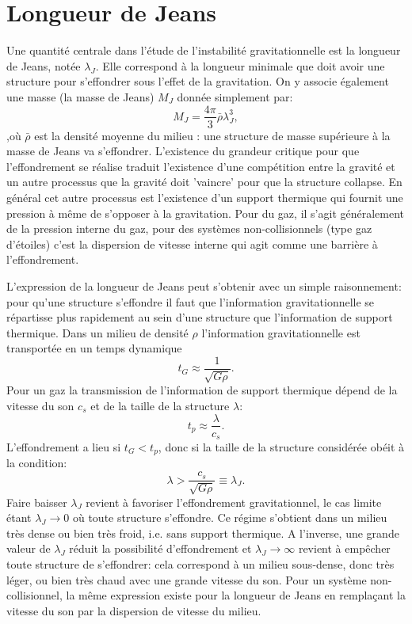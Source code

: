 \section{Longueur de Jeans}
Une quantité centrale dans l'étude de l'instabilité gravitationnelle est la longueur de Jeans, notée $\lambda_J$. Elle correspond à la longueur minimale  que doit avoir une structure pour s'effondrer sous l'effet de la gravitation. On y associe également une masse (la masse de Jeans) $M_J$ donnée simplement par:
\begin{equation}
M_J=\frac{4\pi}{3}\bar\rho\lambda_J^3,
\end{equation}
,où $\bar \rho$ est la densité moyenne du milieu : une structure de masse supérieure à la masse de Jeans va s'effondrer. L'existence du grandeur critique pour que l'effondrement se réalise traduit l'existence d'une compétition entre la gravité et un autre processus que la gravité doit 'vaincre' pour que la structure collapse. En général cet autre processus est l'existence d'un support thermique qui fournit une pression à même de s'opposer à la gravitation. Pour du gaz, il s'agit généralement de la pression interne du gaz, pour des systèmes non-collisionnels (type gaz d'étoiles) c'est la dispersion de vitesse interne qui agit comme une barrière à l'effondrement.

L'expression de la longueur de Jeans peut s'obtenir avec un simple raisonnement: pour qu'une structure s'effondre il faut que l'information gravitationnelle se répartisse plus rapidement au sein d'une structure que l'information de support thermique. Dans un milieu de densité $\rho$ l'information gravitationnelle est transportée en un temps dynamique
\begin{equation}
t_G\approx \frac{1}{\sqrt{G\rho}}.
\end{equation}
Pour un gaz la transmission de l'information de support thermique dépend de la vitesse du son $c_s$ et de la taille de la structure $\lambda$:
\begin{equation}
t_p\approx\frac{\lambda}{c_s}.
\end{equation}
L'effondrement a lieu si $t_G<t_p$, donc si la taille de la structure considérée obéit à la condition:
\begin{equation}
\lambda >\frac{c_s}{\sqrt{G\rho}}\equiv \lambda_J.
\end{equation}
Faire baisser $\lambda_J$ revient à favoriser l'effondrement gravitationnel, le cas limite étant $\lambda_J \rightarrow 0$ où toute structure s'effondre. Ce régime s'obtient dans un milieu très dense ou bien très froid, i.e. sans support thermique.  A l'inverse, une grande valeur de $\lambda_J$ réduit la possibilité d'effondrement et $\lambda_J\rightarrow\infty$ revient à empêcher toute structure de s'effondrer: cela correspond à un milieu sous-dense, donc très léger, ou bien très chaud avec une grande vitesse du son. Pour un système non-collisionnel, la même expression existe pour la longueur de Jeans en remplaçant la vitesse du son par la dispersion de vitesse du milieu.

